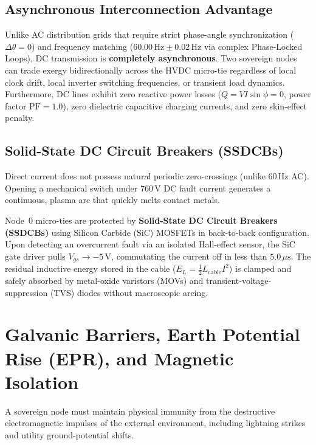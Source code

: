 \subsection{Asynchronous Interconnection Advantage}
Unlike AC distribution grids that require strict phase-angle synchronization ($\Delta\theta = 0$) and frequency matching ($60.00\,\mathrm{Hz} \pm 0.02\,\mathrm{Hz}$ via complex Phase-Locked Loops), DC transmission is \textbf{completely asynchronous}. Two sovereign nodes can trade exergy bidirectionally across the HVDC micro-tie regardless of local clock drift, local inverter switching frequencies, or transient load dynamics. Furthermore, DC lines exhibit zero reactive power losses ($Q = V I \sin\phi = 0$, power factor $\mathrm{PF} = 1.0$), zero dielectric capacitive charging currents, and zero skin-effect penalty.

\subsection{Solid-State DC Circuit Breakers (SSDCBs)}
Direct current does not possess natural periodic zero-crossings (unlike $60\,\mathrm{Hz}$ AC). Opening a mechanical switch under $760\,\mathrm{V}$ DC fault current generates a continuous, plasma arc that quickly melts contact metals.

Node~0 micro-ties are protected by \textbf{Solid-State DC Circuit Breakers (SSDCBs)} using Silicon Carbide (SiC) MOSFETs in back-to-back configuration. Upon detecting an overcurrent fault via an isolated Hall-effect sensor, the SiC gate driver pulls $V_{gs} \to -5\,\mathrm{V}$, commutating the current off in less than $5.0\,\mu\mathrm{s}$. The residual inductive energy stored in the cable ($E_L = \frac{1}{2} L_{\mathrm{cable}} I^2$) is clamped and safely absorbed by metal-oxide varistors (MOVs) and transient-voltage-suppression (TVS) diodes without macroscopic arcing.

\section{Galvanic Barriers, Earth Potential Rise (EPR), and Magnetic Isolation}
\label{sec:em_galvanic}

A sovereign node must maintain physical immunity from the destructive electromagnetic impulses of the external environment, including lightning strikes and utility ground-potential shifts.

